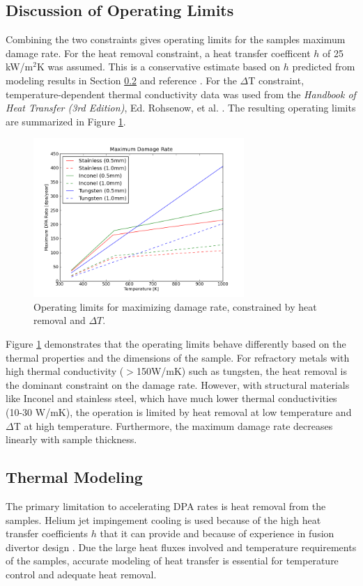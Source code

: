 \documentclass[final,3p,times,twocolumn]{elsarticle} %
\begin{document}
\subsection{Discussion of Operating Limits}
Combining the two constraints gives operating limits for the samples maximum damage rate.  For the heat removal constraint, a heat transfer coefficent $h$ of 25 kW/m$^2$K was assumed. This is a conservative estimate based on $h$ predicted from modeling results in Section \ref{sec:HeatRemoval} and reference \cite{Ihli}. For the $\Delta$T constraint, temperature-dependent thermal conductivity data was used from the \emph{Handbook of Heat Transfer (3rd Edition)}, Ed. Rohsenow, et al. \cite{HTHandbook}.  The resulting operating limits are summarized in Figure \ref{fig:OpLimits}.

\begin{figure}[htbp]
\begin{center}
\includegraphics[width=80mm]{Figures/OpLimits.png}
\caption{Operating limits for maximizing damage rate, constrained by heat removal and $\Delta T$.}
\label{fig:OpLimits}
\end{center}
\end{figure}

Figure \ref{fig:OpLimits} demonstrates that the operating limits behave differently based on the thermal properties and the dimensions of the sample.  For refractory metals with high thermal conductivity ($>$150W/mK) such as tungsten, the heat removal is the dominant constraint on the damage rate.  However, with structural materials like Inconel and stainless steel, which have much lower thermal conductivities (10-30 W/mK), the operation is limited by heat removal at low temperature and $\Delta$T at high temperature.  Furthermore, the maximum damage rate decreases linearly with sample thickness.


\subsection{Thermal Modeling}
\label{sec:HeatRemoval}
The primary limitation to accelerating DPA rates is heat removal from the samples.  Helium jet impingement cooling is used because of the high heat transfer coefficients $h$ that it can provide and because of experience in fusion divertor design \cite{Ihli}.  Due the large heat fluxes involved and temperature requirements of the samples, accurate modeling of heat transfer is essential for temperature control and adequate heat removal.
\end{document}
